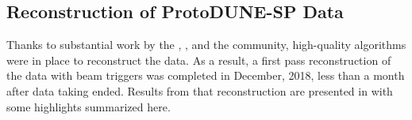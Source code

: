 \subsection{Reconstruction of ProtoDUNE-SP Data}
Thanks to substantial work by the , , and the  community, high-quality algorithms were in place to reconstruct the  data.  As a result, a first pass reconstruction of the  data with beam triggers was completed in December, 2018, less than a month after data taking ended.  Results from that reconstruction are presented in \physchtools %
with some highlights summarized here. 

